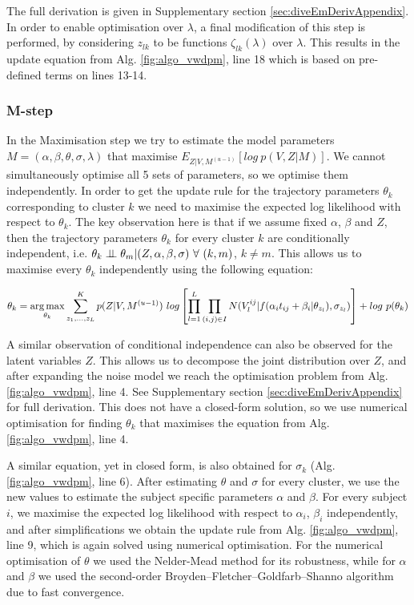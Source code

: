 The full derivation is given in Supplementary section \ref{sec:diveEmDerivAppendix}. In order to enable optimisation over $\lambda$, a final modification of this step is performed, by considering $z_{lk}$ to be functions $\zeta_{lk}(\lambda)$ over $\lambda$. This results in the update equation from Alg. \ref{fig:algo_vwdpm}, line 18 which is based on pre-defined terms on lines 13-14. 


\subsubsection{M-step}

In the Maximisation step we try to estimate the model parameters $M = (\alpha, \beta, \theta, \sigma, \lambda)$ that maximise $E_{Z|V,M^{(u-1)}}[log\ p(V,Z|M)]$. We cannot simultaneously optimise all 5 sets of parameters, so we optimise them independently. In order to get the update rule for the trajectory parameters $\theta_k$ corresponding to cluster $k$ we need to maximise the expected log likelihood with respect to $\theta_k$. The key observation here is that if we assume fixed $\alpha$, $\beta$ and $Z$, then the trajectory parameters $\theta_k$ for every cluster $k$ are conditionally independent, i.e. $\theta_k \perp\!\!\!\perp \theta_m | (Z, \alpha, \beta, \sigma)\ \forall\ (k, m)$, $k \neq m$. This allows us to maximise every $\theta_k$ independently using the following equation:

\begin{equation}
 \theta_k = \operatorname*{arg\,max}_{\theta_k} \sum_{z_1,\dots, z_L}^K p(Z | V, M^{(u-1)})\ log \left[ \prod_{l=1}^L \prod_{(i,j) \in I} N(V_l^{ij} | f(\alpha_i t_{ij} + \beta_i | \theta_{z_l}), \sigma_{z_l}) \right] + log\ p(\theta_k)
\end{equation}

A similar observation of conditional independence can also be observed for the latent variables $Z$. This allows us to decompose the joint distribution over $Z$, and after expanding the noise model we reach the optimisation problem from Alg. \ref{fig:algo_vwdpm}, line 4. See Supplementary section \ref{sec:diveEmDerivAppendix} for full derivation. This does not have a closed-form solution, so we use numerical optimisation for finding $\theta_k$ that maximises the equation from Alg. \ref{fig:algo_vwdpm}, line 4.

A similar equation, yet in closed form, is also obtained for $\sigma_k$ (Alg. \ref{fig:algo_vwdpm}, line 6).  After estimating $\theta$ and $\sigma$ for every cluster, we use the new values to estimate the subject specific parameters $\alpha$ and $\beta$. For every subject $i$, we maximise the expected log likelihood with respect to $\alpha_i$, $\beta_i$ independently, and after simplifications we obtain the update rule from Alg. \ref{fig:algo_vwdpm}, line 9, which is again solved using numerical optimisation. For the numerical optimisation of $\theta$ we used the Nelder-Mead method for its robustness, while for $\alpha$ and $\beta$ we used the second-order Broyden--Fletcher--Goldfarb--Shanno algorithm due to fast convergence. 

